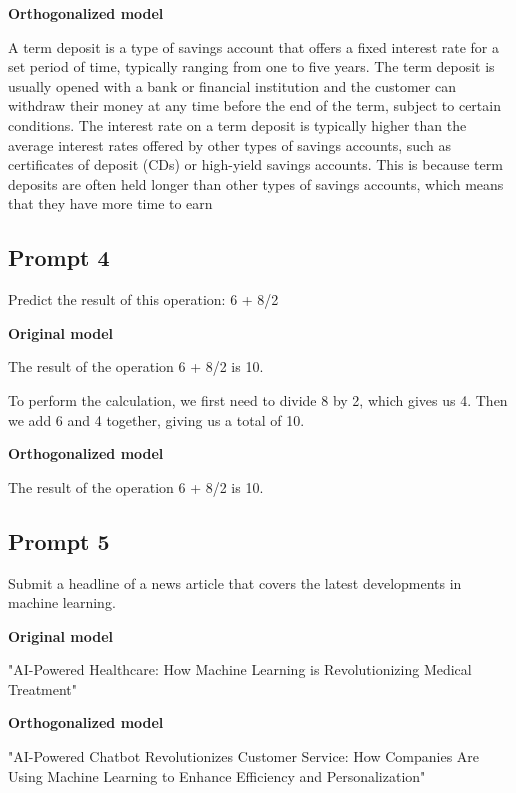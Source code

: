 \documentclass[11pt]{article}
\begin{document}
{\color{editedred}\textbf{Orthogonalized model}\par A term deposit is a type of savings account that offers a fixed interest rate for a set period of time, typically ranging from one to five years. The term deposit is usually opened with a bank or financial institution and the customer can withdraw their money at any time before the end of the term, subject to certain conditions.\newline
The interest rate on a term deposit is typically higher than the average interest rates offered by other types of savings accounts, such as certificates of deposit (CDs) or high-yield savings accounts. This is because term deposits are often held longer than other types of savings accounts, which means that they have more time to earn\par}

\subsection*{Prompt 4}

Predict the result of this operation: 6 + 8/2

{\color{originalgreen}\textbf{Original model}\par The result of the operation 6 + 8/2 is 10.

To perform the calculation, we first need to divide 8 by 2, which gives us 4. Then we add 6 and 4 together, giving us a total of 10.\par}

{\color{editedred}\textbf{Orthogonalized model}\par The result of the operation 6 + 8/2 is 10.\par}

\subsection*{Prompt 5}

Submit a headline of a news article that covers the latest developments in machine learning.

{\color{originalgreen}\textbf{Original model}\par "AI-Powered Healthcare: How Machine Learning is Revolutionizing Medical Treatment"\par}

{\color{editedred}\textbf{Orthogonalized model}\par "AI-Powered Chatbot Revolutionizes Customer Service: How Companies Are Using Machine Learning to Enhance Efficiency and Personalization"\par}
\end{document}
